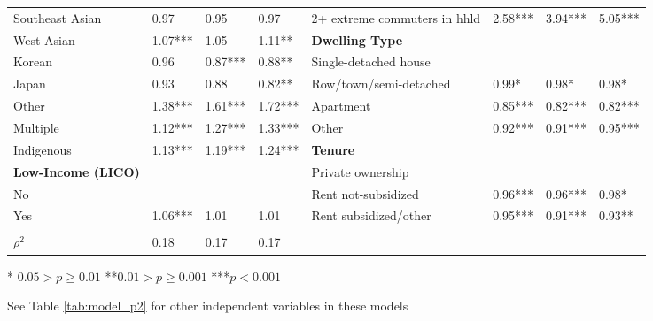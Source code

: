 \documentclass[10 pt,letterpaper]{article}
\begin{document}
\begin{table}[H]
{\begin{tabular}{llllllll}
			Southeast Asian                 & 0.97         & 0.95        & 0.97        & 2+ extreme commuters in hhld & 2.58***      & 3.94***     & 5.05***     \\
			West Asian                      & 1.07***      & 1.05        & 1.11**      & \textbf{Dwelling Type}       &              &             &             \\
			Korean                          & 0.96         & 0.87***     & 0.88**      & Single-detached house        &              &             &             \\
			Japan                           & 0.93         & 0.88        & 0.82**      & Row/town/semi-detached       & 0.99*        & 0.98*       & 0.98*       \\
			Other                           & 1.38***      & 1.61***     & 1.72***     & Apartment                    & 0.85***      & 0.82***     & 0.82***     \\
			Multiple                        & 1.12***      & 1.27***     & 1.33***     & Other                        & 0.92***      & 0.91***     & 0.95***     \\
			Indigenous                      & 1.13***      & 1.19***     & 1.24***     & \textbf{Tenure}              &              &             &             \\
			\textbf{Low-Income (LICO)}      &              &             &             & Private ownership            &              &             &             \\
			No                              &              &             &             & Rent not-subsidized          & 0.96***      & 0.96***     & 0.98*       \\
			Yes                             & 1.06***      & 1.01        & 1.01        & Rent subsidized/other        & 0.95***      & 0.91***     & 0.93**      \\ \cline{1-8}
			
			&       &         &        &         &       &      &      \\ 
			
			
			$\rho^2$                          & 0.18         & 0.17        & 0.17        &    \\ \hline   
		\end{tabular}
		
		
	}
	
	\label{tab:model_p1}
	
	\vspace{2mm}
	
	\footnotesize
	
	* $0.05 > p \geq 0.01$ \hspace{3mm} **$0.01 > p \geq 0.001$ \hspace{3mm} ***$p < 0.001$
	
	\vspace{1mm}
	
	See Table \ref{tab:model_p2} for other independent variables in these models
	
	\vspace{4.5mm}
	
	\normalsize 
	
	
\end{table}
\end{document}
